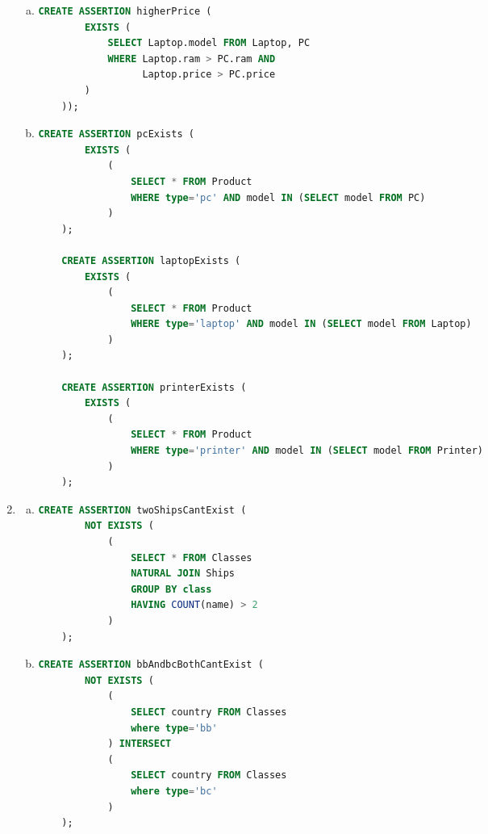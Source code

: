 \documentclass[12pt]{article}
\begin{document}
\begin{enumerate}[1.]
\begin{enumerate}[a)]
        \item

    \begin{lstlisting}[language=SQL]
    CREATE ASSERTION higherPrice (
        EXISTS (
            SELECT Laptop.model FROM Laptop, PC
            WHERE Laptop.ram > PC.ram AND
                  Laptop.price > PC.price
        )
    ));
    \end{lstlisting}

        \item

    \begin{lstlisting}[language=SQL]
    CREATE ASSERTION pcExists (
        EXISTS (
            (
                SELECT * FROM Product
                WHERE type='pc' AND model IN (SELECT model FROM PC)
            )
    );

    CREATE ASSERTION laptopExists (
        EXISTS (
            (
                SELECT * FROM Product
                WHERE type='laptop' AND model IN (SELECT model FROM Laptop)
            )
    );

    CREATE ASSERTION printerExists (
        EXISTS (
            (
                SELECT * FROM Product
                WHERE type='printer' AND model IN (SELECT model FROM Printer)
            )
    );
    \end{lstlisting}



    \end{enumerate}

    \item

    \begin{enumerate}[a)]
        \item

    \begin{lstlisting}[language=SQL]
    CREATE ASSERTION twoShipsCantExist (
        NOT EXISTS (
            (
                SELECT * FROM Classes
                NATURAL JOIN Ships
                GROUP BY class
                HAVING COUNT(name) > 2
            )
    );
    \end{lstlisting}

        \item


    \begin{lstlisting}[language=SQL]
    CREATE ASSERTION bbAndbcBothCantExist (
        NOT EXISTS (
            (
                SELECT country FROM Classes
                where type='bb'
            ) INTERSECT
            (
                SELECT country FROM Classes
                where type='bc'
            )
    );
    \end{lstlisting}


\end{enumerate}
\end{enumerate}
\end{document}

